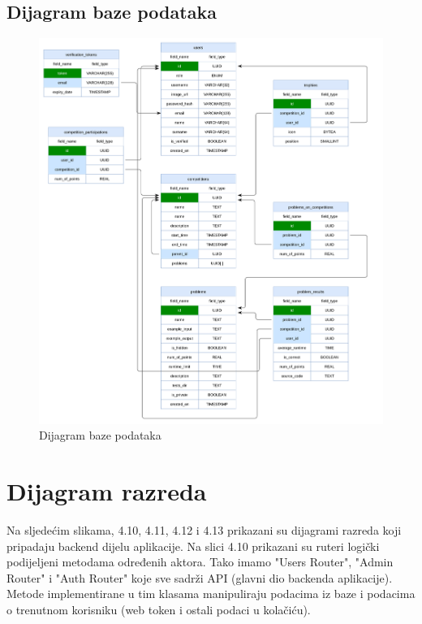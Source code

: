 		\subsection{Dijagram baze podataka}
		
		
		\begin{figure}[htbp]
			\centering
			\includegraphics[scale=0.4]{slike/db_dijagram.png}
			\caption{Dijagram baze podataka}
		\end{figure}
		\eject
		
			
		\section{Dijagram razreda}
		
			
			
			Na sljedećim slikama, 4.10, 4.11, 4.12 i 4.13 prikazani su dijagrami razreda koji pripadaju backend dijelu aplikacije. Na slici 4.10 prikazani su ruteri logički podijeljeni metodama određenih aktora. Tako imamo "Users Router", "Admin Router" i "Auth Router" koje sve sadrži API (glavni dio backenda aplikacije). Metode implementirane u tim klasama manipuliraju podacima iz baze i podacima o trenutnom korisniku (web token i ostali podaci u kolačiću).
			
